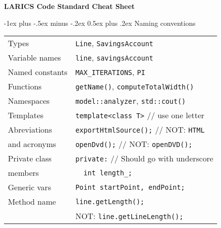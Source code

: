 \documentclass[10pt,landscape]{article}
\makeatletter
\renewcommand{\section}{\@startsection{section}{1}{0mm}%
                                {-1ex plus -.5ex minus -.2ex}%
                                {0.5ex plus .2ex}%
                                {\normalfont\large\bfseries}}
\makeatother
\begin{document}
\raggedright
\footnotesize
\begin{multicols}{3}


\setlength{\premulticols}{1pt}
\setlength{\postmulticols}{1pt}
\setlength{\multicolsep}{1pt}
\setlength{\columnsep}{2pt}

\begin{center}
     \Large{\textbf{LARICS Code Standard Cheat Sheet}} \\
\end{center}

\section{Naming conventions}
\begin{tabular}{@{}ll@{}}
	Types           & \verb!Line!, \verb!SavingsAccount! \\
	Variable names  & \verb!line!, \verb!savingsAccount! \\
	Named constants & \verb!MAX_ITERATIONS!, \verb!PI! \\
	Functions       & \verb!getName()!, \verb!computeTotalWidth()! \\
	Namespaces      & \verb!model::analyzer!, \verb!std::cout()! \\
	Templates       & \verb!template<class T>! // use one letter\\
	Abreviations	& \verb!exportHtmlSource();! // NOT: \verb!HTML! \\
	and acronyms    & \verb!openDvd();! // NOT: \verb!openDVD();! \\
	Private class   & \verb!private:! // Should go with underscore \\
	members         & \verb!  int length_;! \\
	Generic vars    & \verb!Point startPoint, endPoint;! \\
	Method name     & \verb!line.getLength();! \\ 
	                & \hspace{0.5cm} NOT: \verb!line.getLineLength();! \\	
\end{tabular}


\end{multicols}
\end{document}
